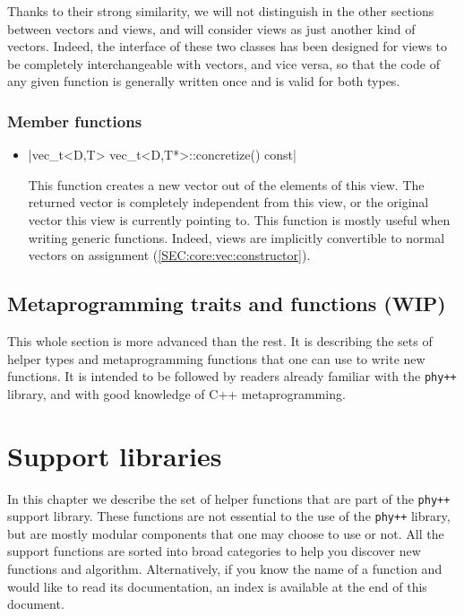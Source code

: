 \documentclass[12pt]{report}
\newcommand{\phypp}{\texttt{phy++}\xspace}
\newenvironment{warning}
{
    \begin{mdframed}[style=warning,frametitle={Warning}]
}
{
    \end{mdframed}
}
\begin{document}
Thanks to their strong similarity, we will not distinguish in the other sections between vectors and views, and will consider views as just another kind of vectors. Indeed, the interface of these two classes has been designed for views to be completely interchangeable with vectors, and vice versa, so that the code of any given function is generally written once and is valid for both types.

\subsection{Member functions \label{SEC:core:view:member_fun}}

\begin{itemize}
\item \cppinline|vec_t<D,T> vec_t<D,T*>::concretize() const|

This function creates a new vector out of the elements of this view. The returned vector is completely independent from this view, or the original vector this view is currently pointing to. This function is mostly useful when writing generic functions. Indeed, views are implicitly convertible to normal vectors on assignment (\ref{SEC:core:vec:constructor}).
\end{itemize}

\section{Metaprogramming traits and functions (WIP) \label{SEC:core:meta}}

\begin{warning}
This whole section is more advanced than the rest. It is describing the sets of helper types and metaprogramming functions that one can use to write new functions. It is intended to be followed by readers already familiar with the \phypp library, and with good knowledge of C++ metaprogramming.
\end{warning}






\chapter{Support libraries \label{SEC:support}}

In this chapter we describe the set of helper functions that are part of the \phypp support library. These functions are not essential to the use of the \phypp library, but are mostly modular components that one may choose to use or not. All the support functions are sorted into broad categories to help you discover new functions and algorithm. Alternatively, if you know the name of a function and would like to read its documentation, an index is available at the end of this document.
\end{document}
